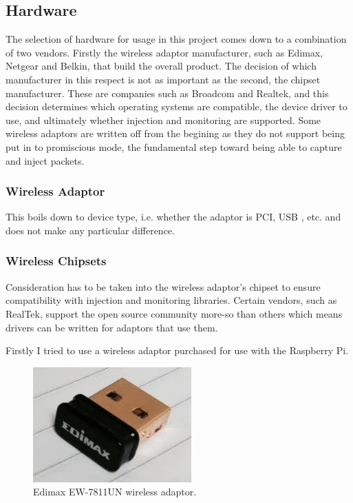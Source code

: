 \subsection{Hardware}
\label{research:hardware}
The selection of hardware for usage in this project comes down to a combination of two vendors. Firstly the wireless adaptor manufacturer, such as Edimax, Netgear and Belkin, that build the overall product. The decision of which manufacturer in this respect is not as important as the second, the chipset manufacturer.  These are companies such as Broadcom and Realtek, and this decision determines which operating systems are compatible, the device driver to use, and ultimately whether injection and monitoring are supported. Some wireless adaptors are written off from the begining as they do not support being put in to promiscious mode, the fundamental step toward being able to capture and inject packets.

\subsubsection{Wireless Adaptor}
This boils down to device type, i.e. whether the adaptor is PCI, USB , etc. and does not make any particular difference.
\subsubsection{Wireless Chipsets}
Consideration has to be taken into the wireless adaptor's chipset to ensure compatibility with injection and monitoring libraries. Certain vendors, such as RealTek, support the open source community more-so than others which means drivers can be written for adaptors that use them.

Firstly I tried to use a wireless adaptor purchased for use with the Raspberry Pi.

\begin{figure}[h!]
\centering\includegraphics{research/figures/edimax.png}
\caption{Edimax EW-7811UN wireless adaptor.}
\end{figure}

